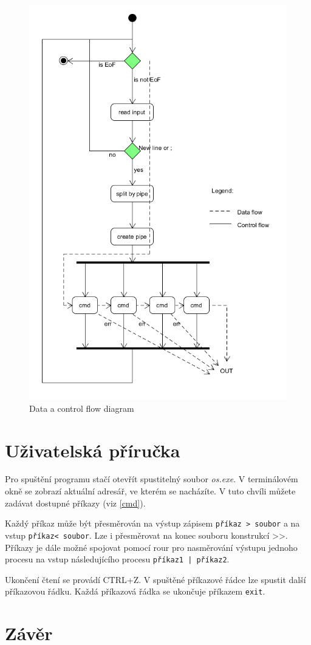 \documentclass[a4paper]{article}
\begin{document}
\begin{figure}[!h] 
\centering
 \includegraphics[width=1\textwidth]{./flow2.png}
\caption{Data a control flow diagram}
\end{figure}


\section{Uživatelská příručka}
Pro spuštění programu stačí otevřít spustitelný soubor \emph{os.exe}. V terminálovém okně se zobrazí aktuální adresář, ve kterém se nacházíte. V tuto chvíli můžete zadávat dostupné příkazy (viz \ref{cmd}).


Každý příkaz může být přesměrován na výstup zápisem  \verb+příkaz > soubor+ a na vstup  \verb+příkaz< soubor+. Lze i přesměrovat na konec souboru konstrukcí \textgreater\textgreater. Příkazy je dále možné spojovat pomocí rour pro nasměrování výstupu jednoho procesu na vstup následujícího procesu  \verb+příkaz1 | příkaz2+.

Ukončení čtení se provádí CTRL+Z. 
V spuštěné příkazové řádce lze spustit další příkazovou řádku. Každá příkazová řádka se ukončuje příkazem \verb+exit+. 



\section{Závěr}
\end{document}
